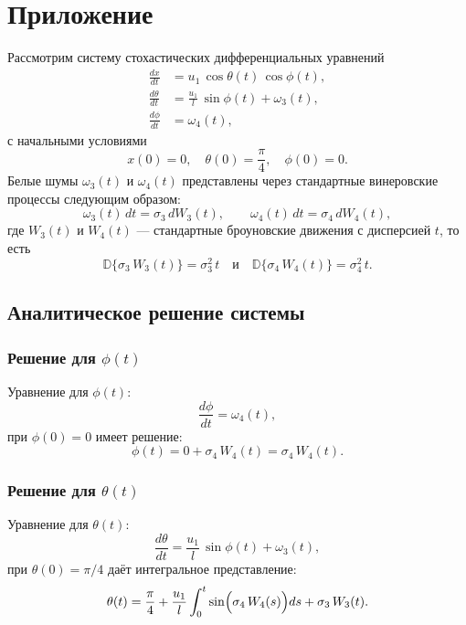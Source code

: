 \documentclass[12pt]{article}
\begin{document}
\newpage

\section{Приложение}

Рассмотрим систему стохастических дифференциальных уравнений
\begin{equation}\label{eq:system}
	\begin{aligned}
		\frac{dx}{dt}      & = u_1\,\cos\theta(t)\,\cos\phi(t),          \\
		\frac{d\theta}{dt} & = \frac{u_1}{l}\,\sin\phi(t) + \omega_3(t), \\
		\frac{d\phi}{dt}   & = \omega_4(t),
	\end{aligned}
\end{equation}
с начальными условиями
\[
	x(0)=0,\quad \theta(0)=\frac{\pi}{4},\quad \phi(0)=0.
\]
Белые шумы $\omega_3(t)$ и $\omega_4(t)$ представлены через стандартные винеровские процессы следующим образом:
\[
	\omega_3(t)\,dt=\sigma_3\,dW_3(t),\qquad \omega_4(t)\,dt=\sigma_4\,dW_4(t),
\]
где $W_3(t)$ и $W_4(t)$ --- стандартные броуновские движения с дисперсией $t$, то есть
\[
	\mathbb{D}\{\sigma_3\,W_3(t)\} = \sigma_3^2\,t \quad \text{и} \quad \mathbb{D}\{\sigma_4\,W_4(t)\} = \sigma_4^2\,t.
\]

\subsection{Аналитическое решение системы}

\subsubsection*{Решение для $\phi(t)$}
Уравнение для $\phi(t)$:
\[
	\frac{d\phi}{dt}=\omega_4(t),
\]
при $\phi(0)=0$ имеет решение:
\begin{equation}\label{eq:phi}
	\phi(t)=0+\sigma_4\,W_4(t)=\sigma_4\,W_4(t).
\end{equation}

\subsubsection*{Решение для $\theta(t)$}
Уравнение для $\theta(t)$:
\[
	\frac{d\theta}{dt}=\frac{u_1}{l}\,\sin\phi(t)+\omega_3(t),
\]
при $\theta(0)=\pi/4$ даёт интегральное представление:
\begin{equation}\label{eq:theta}
	\theta(t)=\frac{\pi}{4}+\frac{u_1}{l}\int_{0}^{t}\sin\Bigl(\sigma_4\,W_4(s)\Bigr)ds+\sigma_3\,W_3(t).
\end{equation}
\end{document}
